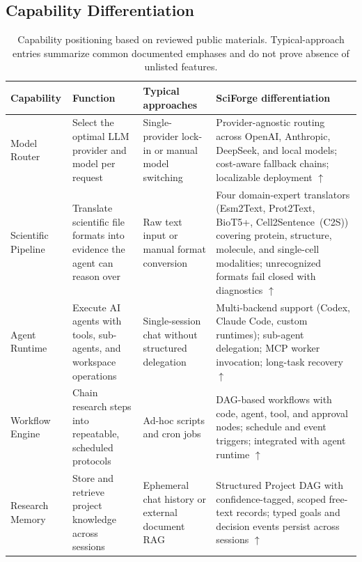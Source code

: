 \documentclass[sn-basic,Numbered,pdflatex]{sn-jnl}
\begin{document}
\clearpage
\begin{appendices}
\renewcommand{\theHtable}{A.\arabic{table}}
\renewcommand{\theHfigure}{app.\Alph{section}.\arabic{figure}}

\section{Capability Differentiation}

\begin{table}[ht!]
\caption{Capability positioning based on reviewed public materials. Typical-approach entries summarize common documented emphases and do not prove absence of unlisted features.}
\label{tab:capability_differentiation}
\scriptsize
\centering
\setlength{\tabcolsep}{2pt}
\renewcommand{\arraystretch}{1.04}
\begin{tabular}{@{}L{2.1cm} L{2.7cm} L{3.2cm} L{3.8cm}@{}}
\toprule
\textbf{Capability} & \textbf{Function} & \textbf{Typical approaches} & SciForge differentiation \\
\midrule
Model Router
& Select the optimal LLM provider and model per request
& Single-provider lock-in or manual model switching
& Provider-agnostic routing across OpenAI, Anthropic, DeepSeek, and local models; cost-aware fallback chains; localizable deployment $\uparrow$ \\
Scientific Pipeline
& Translate scientific file formats into evidence the agent can reason over
& Raw text input or manual format conversion
& Four domain-expert translators (Esm2Text, Prot2Text, BioT5+, Cell2Sentence~(C2S)) covering protein, structure, molecule, and single-cell modalities; unrecognized formats fail closed with diagnostics $\uparrow$ \\
Agent Runtime
& Execute AI agents with tools, sub-agents, and workspace operations
& Single-session chat without structured delegation
& Multi-backend support (Codex, Claude Code, custom runtimes); sub-agent delegation; MCP worker invocation; long-task recovery $\uparrow$ \\
Workflow Engine
& Chain research steps into repeatable, scheduled protocols
& Ad-hoc scripts and cron jobs
& DAG-based workflows with code, agent, tool, and approval nodes; schedule and event triggers; integrated with agent runtime $\uparrow$ \\
Research Memory
& Store and retrieve project knowledge across sessions
& Ephemeral chat history or external document RAG
& Structured Project DAG with confidence-tagged, scoped free-text records; typed goals and decision events persist across sessions $\uparrow$ \\

\end{tabular}
\end{table}
\end{appendices}
\end{document}
